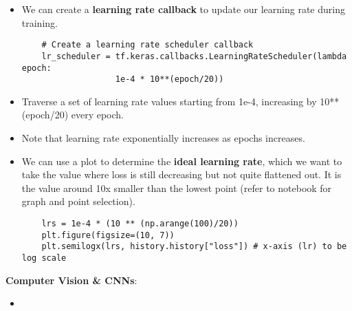 \documentclass[11pt, a4paper]{article}
\begin{document}
	\begin{itemize}
		\item We can create a \textbf{learning rate callback} to update our learning rate during training.
	\begin{lstlisting}
	# Create a learning rate scheduler callback
	lr_scheduler = tf.keras.callbacks.LearningRateScheduler(lambda epoch: 
	               1e-4 * 10**(epoch/20)) \end{lstlisting}
		\item Traverse a set of learning rate values starting from 1e-4, increasing by 10**(epoch/20) every epoch.
		\item Note that learning rate exponentially increases as epochs increases.
		\item We can use a plot to determine the \textbf{ideal learning rate}, which we want to take the value where loss is still decreasing but not quite flattened out. It is the value around 10x smaller than the lowest point (refer to notebook for graph and point selection).
	\begin{lstlisting}
	lrs = 1e-4 * (10 ** (np.arange(100)/20))
	plt.figure(figsize=(10, 7))
	plt.semilogx(lrs, history.history["loss"]) # x-axis (lr) to be log scale \end{lstlisting}
	\end{itemize}\vspace*{6mm}
	\noindent \Large \textbf{Computer Vision \& CNNs}: \normalsize
	\begin{itemize}
		\item 
	\end{itemize}
	
	
	
	
	
\end{document}
